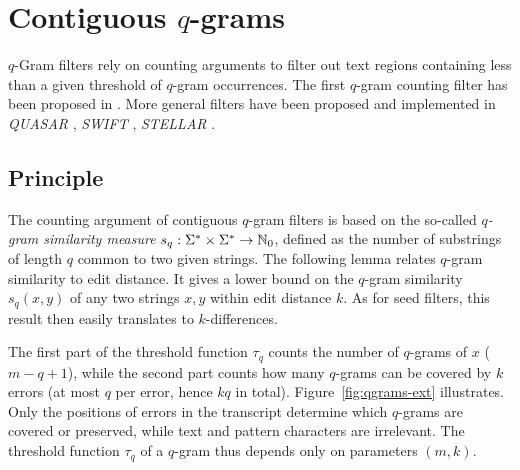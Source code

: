 




\section{Contiguous $q$-grams}
\label{sec:filtering:qgrams-ext}

$q$-Gram filters rely on counting arguments to filter out text regions containing less than a given threshold of $q$-gram occurrences.
The first $q$-gram counting filter has been proposed in \citep{Jokinen1991}.
More general filters have been proposed and implemented in \emph{QUASAR} \citep{Burkhardt1999}, \emph{SWIFT} \citep{Rasmussen2006}, \emph{STELLAR} \citep{Kehr2011}.

\subsection{Principle}

The counting argument of contiguous $q$-gram filters is based on the so-called \emph{$q$-gram similarity measure} $s_q : \Sigma^{*} \times \Sigma^{*} \rightarrow \mathbb {N}_0$, defined as the number of substrings of length $q$ common to two given strings.
The following lemma relates $q$-gram similarity to edit distance.
It gives a lower bound on the $q$-gram similarity $s_q(x,y)$ of any two strings $x,y$ within edit distance $k$.
As for seed filters, this result then easily translates to $k$-differences.

The first part of the threshold function $\tau_q$ counts the number of $q$-grams of $x$ (\ie $m - q + 1$), while the second part counts how many $q$-grams can be covered by $k$ errors (\ie at most $q$ per error, hence $kq$ in total).
Figure~\ref{fig:qgrams-ext} illustrates.
Only the positions of errors in the transcript determine which $q$-grams are covered or preserved, while text and pattern characters are irrelevant.
The threshold function $\tau_q$ of a $q$-gram thus depends only on parameters $(m,k)$.


